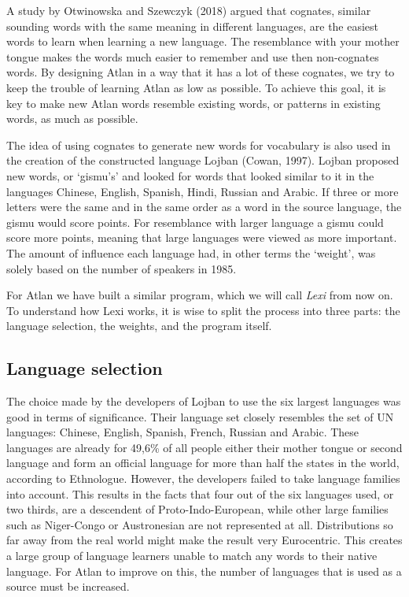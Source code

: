 A study by Otwinowska and Szewczyk (2018) argued that cognates, similar sounding words with the same meaning in different languages, are the easiest words to learn when learning a new language. The resemblance with your mother tongue makes the words much easier to remember and use then non-cognates words. By designing Atlan in a way that it has a lot of these cognates, we try to keep the trouble of learning Atlan as low as possible. To achieve this goal, it is key to make new Atlan words resemble existing words, or patterns in existing words, as much as possible. 

The idea of using cognates to generate new words for vocabulary is also used in the creation of the constructed language Lojban (Cowan, 1997).  Lojban proposed new words, or ‘gismu’s’ and looked for words that looked similar to it in the languages Chinese, English, Spanish, Hindi, Russian and Arabic. If three or more letters were the same and in the same order as a word in the source language, the gismu would score points. For resemblance with larger language a gismu could score more points, meaning that large languages were viewed as more important. The amount of influence each language had, in other terms the ‘weight’, was solely based on the number of speakers in 1985.  

For Atlan we have built a similar program, which we will call \textit{Lexi} from now on. To understand how Lexi works, it is wise to split the process into three parts: the language selection, the weights, and the program itself.  

\subsection{Language selection }

The choice made by the developers of Lojban to use the six largest languages was good in terms of significance. Their language set closely resembles the set of UN languages: Chinese, English, Spanish, French, Russian and Arabic. These languages are already for 49,6\% of all people either their mother tongue or second language and form an official language for more than half the states in the world, according to Ethnologue. However, the developers failed to take language families into account. This results in the facts that four out of the six languages used, or two thirds, are a descendent of Proto-Indo-European, while other large families such as Niger-Congo or Austronesian are not represented at all. Distributions so far away from the real world might make the result very Eurocentric. This creates a large group of language learners unable to match any words to their native language. For Atlan to improve on this, the number of languages that is used as a source must be increased. 

